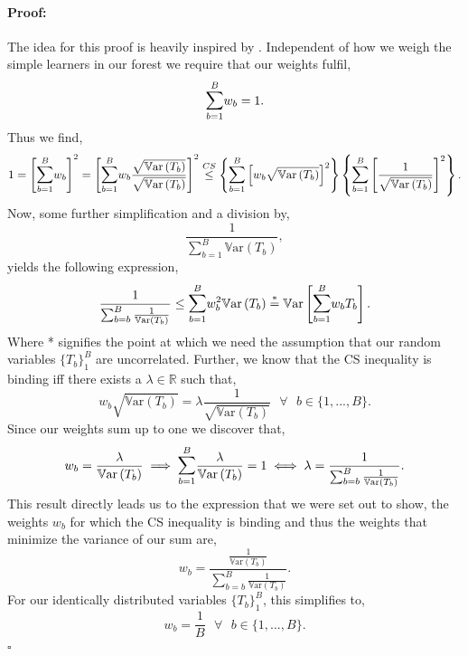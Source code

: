\documentclass[a4paper,12pt, headsepline]{scrartcl}
\newenvironment{proof}{\paragraph{Proof:}}{\hfill$\square$}
\numberwithin{equation}{section}
\begin{document}
 \begin{proof}
 The idea for this proof is heavily inspired by \citet{shahar2017}.
 Independent of how we weigh the simple learners in our forest we require that our weights fulfil,
 \[
 \mathlarger{\sum}\limits_{b = 1}^B w_b = 1.
 \]
 Thus we find,
 \begin{gather*}
 1 = \left[\mathlarger{\sum}\limits_{b = 1}^B w_b\right]^2 = \left[\mathlarger{\sum}\limits_{b = 1}^B w_b\frac{\sqrt{\mathbb{V}\text{ar}\left( T_b \right)}}{\sqrt{\mathbb{V}\text{ar}\left( T_b \right)}}\right]^2 \overset{CS}{\leq} \left\{ \mathlarger{\sum}\limits_{b = 1}^B \left[w_b \sqrt{\mathbb{V}\text{ar}\left( T_b \right)} \right]^2 \right\} \left\{ \mathlarger{\sum}\limits_{b = 1}^B \left[ \frac{1}{\sqrt{\mathbb{V}\text{ar}\left( T_b \right)}} \right]^2 \right\}.
 \end{gather*}
 Now, some further simplification and a division by,
 \[
 \frac{1}{\sum_{b = 1}^B \mathbb{V}\text{ar}\left( T_b \right)},
 \]
 yields the following expression,
 \[
\frac{1}{\sum_{b = b}^B \frac{1}{\mathbb{V}\text{ar}\left( T_b \right)}} \leq
\mathlarger{\sum}\limits_{b = 1}^B w_b^2 \mathbb{V}\text{ar}\left( T_b \right) \overset{*}{=} 
\mathbb{V}\text{ar}\left[\mathlarger{\sum}\limits_{b = 1}^B w_b T_b \right].
 \]
 Where * signifies the point at which we need the assumption that our random variables $\{T_b\}_1^B$ are uncorrelated. Further, we know that the CS inequality is binding iff there exists a $\lambda \in \mathbb{R}$ such that,
 \[
 w_b \sqrt{\mathbb{V}\text{ar}\left( T_b \right)} = \lambda \frac{1}{\sqrt{\mathbb{V}\text{ar}\left( T_b \right)}} \text{ } \forall \text{ } b\in \{1, ..., B\}.
 \]
 Since our weights sum up to one we discover that,
 \[
 w_b = \frac{\lambda}{\mathbb{V}\text{ar}\left( T_b \right)} \implies 
 \mathlarger{\sum}\limits_{b = 1}^B \frac{\lambda}{\mathbb{V}\text{ar}\left( T_b \right)} = 1 \iff
 \lambda = \frac{1}{\sum_{b = b}^B\frac{1}{\mathbb{V}\text{ar}\left( T_b \right)}}.
 \]
 This result directly leads us to the expression that we were set out to show, the weights $w_b$ for which the CS inequality is binding and thus the weights that minimize the variance of our sum are,
 \[
 w_b = \frac{\frac{1}{\mathbb{V}\text{ar}\left( T_b \right)}}{\sum_{b = b}^B\frac{1}{\mathbb{V}\text{ar}\left( T_b \right)}}.
 \]
 For our identically distributed variables  $\{T_b\}_1^B$, this simplifies to,
\[
w_b = \frac{1}{B}\text{ } \forall \text{ } b\in \{1, ..., B\}.
\]  
 \end{proof}
\end{document}
